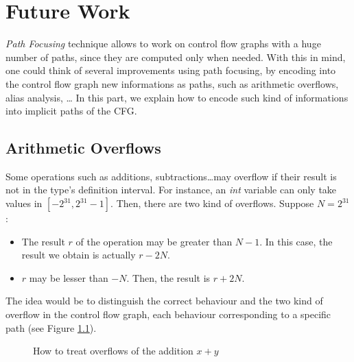 \documentclass[a4paper,english,titlepage,11pt]{report}
\begin{document}
\chapter{Future Work}
\label{future}
\emph{Path Focusing} technique allows to work on control flow graphs with a huge
number of paths, since they are computed only when needed. With this in mind,
one could think of several improvements using path focusing, by encoding into
the control flow graph new informations as paths, such as arithmetic overflows,
alias analysis, \dots
In this part, we explain how to encode such kind of informations into implicit
paths of the CFG.

	\section{Arithmetic Overflows}

Some operations such as additions, subtractions\dots may overflow if their
result is not in the type's definition interval. For instance, an
\emph{int} variable can only take values in $[-2^{31}, 2^{31} -1]$. Then, there
are two kind of overflows. Suppose $N=2^{31}$:
\begin{itemize}
\item The result $r$ of the operation may be greater than $N-1$. In this case,
the result we obtain is actually $r-2N$.
\item $r$ may be lesser than $-N$. Then, the result is $r+2N$.
\end{itemize}

The idea would be to distinguish the correct behaviour and the two kind of
overflow in the control flow graph, each behaviour corresponding to a specific
path (see Figure \ref{overflow}).

\begin{figure}[!h]
\centering
{}
\caption{How to treat overflows of the addition $x+y$}
\label{overflow}
\end{figure}
\end{document}
